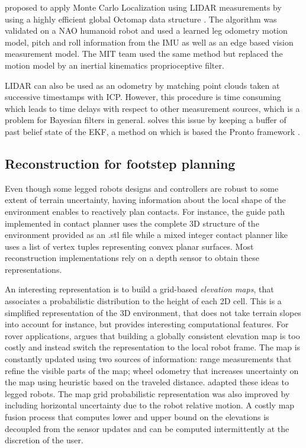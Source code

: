 \cite{hornung2014monte} proposed to apply Monte Carlo Localization using LIDAR measurements by using a highly efficient global Octomap data structure \cite{hornung2013octomap}.
The algorithm was validated on a NAO humanoid robot and used a learned leg odometry motion model, pitch and roll information from the IMU as well as an edge based vision measurement model.
The MIT team \cite{fallon2014drift} used the same method but replaced the motion model by an inertial kinematics proprioceptive filter. 

LIDAR can also be used as an odometry by matching point clouds taken at successive timestamps with ICP. However, this procedure is time consuming 
which leads to time delays with respect to other measurement sources, which is a problem for Bayesian filters in general. 
\cite{nobili2017heterogeneous} solves this issue by keeping a buffer of past belief state of the EKF, a method on which is 
based the Pronto framework \cite{camurri2020pronto}.



\subsection{Reconstruction for footstep planning}
Even though some legged robots designs and controllers \cite{reher2019dynamic, bledt2018cheetah} are robust to some extent of terrain uncertainty, having information about the local
shape of the environment enables to reactively plan contacts. For instance, the guide path implemented in contact planner \cite{tonneau2018efficient} uses the complete 3D structure of the environment
provided as an .stl file while a mixed integer contact planner like \cite{tonneau2020sl1m} uses a list of vertex tuples representing convex planar surfaces.
Most reconstruction implementations rely on a depth sensor to obtain these representations.

An interesting representation is to build a grid-based \textit{elevation maps}, that associates a probabilistic distribution to the height of each 2D cell. 
This is a simplified representation of the 3D environment, that does not take terrain slopes into account for instance, but provides interesting computational features. 
For rover applications, \cite{kleiner2007real} argues that building a globally consistent elevation map is too costly and instead switch the representation to the local robot frame. 
The map is constantly updated using two sources of information: range measurements that refine the visible parts of the map; wheel odometry that increases uncertainty on the map 
using heuristic based on the traveled distance. \cite{fankhauser2014robot, fankhauser2018probabilistic} adapted these ideas to legged robots. The map grid probabilistic representation
was also improved by including horizontal uncertainty due to the robot relative motion. A costly map fusion process that computes lower and upper bound on the elevations
is decoupled from the sensor updates and can be computed intermittently at the discretion of the user. 

